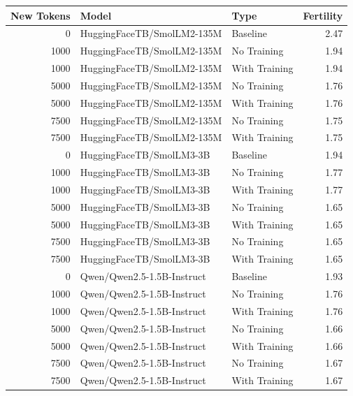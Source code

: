 \begin{tabular}{rllr}
    \toprule
    New Tokens & Model & Type & Fertility \\
    \midrule
    0 & HuggingFaceTB/SmolLM2-135M & Baseline & 2.47 \\
    1000 & HuggingFaceTB/SmolLM2-135M & No Training & 1.94 \\
    1000 & HuggingFaceTB/SmolLM2-135M & With Training & 1.94 \\
    5000 & HuggingFaceTB/SmolLM2-135M & No Training & 1.76 \\
    5000 & HuggingFaceTB/SmolLM2-135M & With Training & 1.76 \\
    7500 & HuggingFaceTB/SmolLM2-135M & No Training & 1.75 \\
    7500 & HuggingFaceTB/SmolLM2-135M & With Training & 1.75 \\
    0 & HuggingFaceTB/SmolLM3-3B & Baseline & 1.94 \\
    1000 & HuggingFaceTB/SmolLM3-3B & No Training & 1.77 \\
    1000 & HuggingFaceTB/SmolLM3-3B & With Training & 1.77 \\
    5000 & HuggingFaceTB/SmolLM3-3B & No Training & 1.65 \\
    5000 & HuggingFaceTB/SmolLM3-3B & With Training & 1.65 \\
    7500 & HuggingFaceTB/SmolLM3-3B & No Training & 1.65 \\
    7500 & HuggingFaceTB/SmolLM3-3B & With Training & 1.65 \\
    0 & Qwen/Qwen2.5-1.5B-Instruct & Baseline & 1.93 \\
    1000 & Qwen/Qwen2.5-1.5B-Instruct & No Training & 1.76 \\
    1000 & Qwen/Qwen2.5-1.5B-Instruct & With Training & 1.76 \\
    5000 & Qwen/Qwen2.5-1.5B-Instruct & No Training & 1.66 \\
    5000 & Qwen/Qwen2.5-1.5B-Instruct & With Training & 1.66 \\
    7500 & Qwen/Qwen2.5-1.5B-Instruct & No Training & 1.67 \\
    7500 & Qwen/Qwen2.5-1.5B-Instruct & With Training & 1.67 \\
    \bottomrule
\end{tabular}

% 
%
%
%

